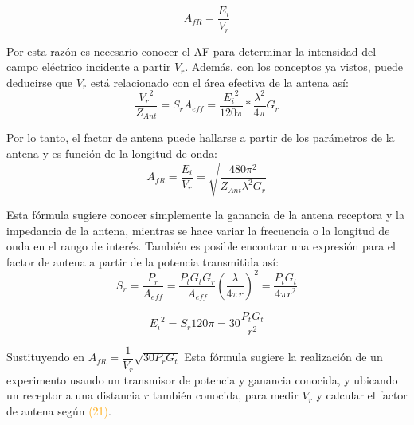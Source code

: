\begin{equation} \label{equ_sesenta_cuatro}
	  A_{fR} = \dfrac{E_i}{V_r}
\end{equation}

Por esta razón es necesario conocer el AF para determinar la intensidad del campo eléctrico incidente a partir $V_r$. Además, con los conceptos ya vistos, puede deducirse que  $V_r$ está relacionado con el área efectiva de la antena así: \\

\begin{equation} \label{equ_sesenta_cinco}
	 \dfrac{{V_{r}}^{2}}{Z_{Ant}} = S_{r} A_{eff}= \dfrac{{E_{i}}^{2}}{120 \pi} * \dfrac{\lambda^{2}}{4\pi} G_{r}
\end{equation}

Por lo tanto, el factor de antena puede hallarse a partir de los parámetros de la antena y es función de la longitud de onda: \\
        
\begin{equation} \label{equ_sesenta_sies}
	  A_{fR} = \dfrac{E_i}{V_r} = \sqrt{\dfrac{480\pi^{2}}{Z_{Ant} \lambda^{2}G_{r}}}
\end{equation}

Esta fórmula sugiere conocer simplemente la ganancia de la antena receptora y la impedancia de la antena, mientras se hace variar la frecuencia o la longitud de onda en el rango de interés. También es posible encontrar una expresión para el factor de antena a partir de la potencia transmitida así: \\

\begin{equation} \label{equ_sesenta_siete}
S_{r}=\dfrac{P_{r}}{A_{eff}}= \dfrac{P_{t}G_{t}G_{r}}{A_{eff}} (\dfrac{\lambda}{4 \pi r})^{2}=\frac{P_{t}G_{t}}{4\pi r^{2}} 
\end{equation}

\begin{equation} \label{equ_sesenta_ocho}
{E_{i}}^{2} = S_{r}120\pi =30 \dfrac{P_{t} G_{t}}{r^{2}}
\end{equation}

Sustituyendo en $A_{fR} = \dfrac{1}{V_r}\sqrt{30P_{r}G_{t}}$ Esta fórmula sugiere la realización de un experimento usando un transmisor de potencia y ganancia conocida, y ubicando un receptor a una distancia $r$ también conocida, para medir $V_r$ y calcular el factor de antena según  \textcolor{orange}{(21)}. \\

